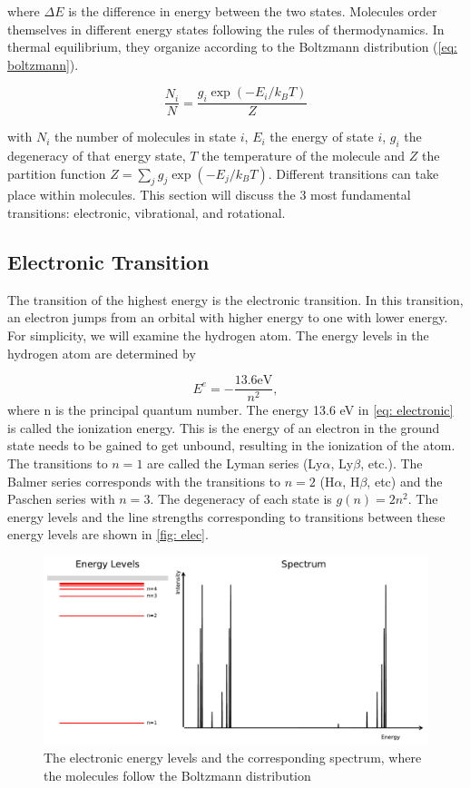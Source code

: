 \documentclass[twoside, single, authoryear, semicolon, 12pt]{lion-msc}
\newcommand{\4}{$_4$}
\newcommand{\3}{$_3$}
\newcommand{\2}{$_2$}
\begin{document}
where $\Delta E$ is the difference in energy between the two states. Molecules order themselves in different energy states following the rules of thermodynamics. In thermal equilibrium, they organize according to the Boltzmann distribution (\autoref{eq: boltzmann}). 

\begin{equation}
    \frac{N_i}{N}=\frac{g_i\exp{(-E_i/k_BT)}}{Z}
    \label{eq: boltzmann}
\end{equation}

with $N_i$ the number of molecules in state $i$, $E_i$ the energy of state $i$, $g_i$ the degeneracy of that energy state, $T$ the temperature of the molecule and $Z$ the partition function $Z=\sum_j g_j\exp{(-E_j/k_BT)}$.
Different transitions can take place within molecules. This section will discuss the 3 most fundamental transitions: electronic, vibrational, and rotational.

\subsection{Electronic Transition}
The transition of the highest energy is the electronic transition. In this transition, an electron jumps from an orbital with higher energy to one with lower energy. For simplicity, we will examine the hydrogen atom. The energy levels in the hydrogen atom are determined by 

\begin{equation}
    E^e=-\frac{13.6\mathrm{ eV}}{n^2},
    \label{eq: electronic}
\end{equation}
where n is the principal quantum number. The energy 13.6 eV in \autoref{eq: electronic} is called the ionization energy. This is the energy of an electron in the ground state needs to be gained to get unbound, resulting in the ionization of the atom. The transitions to $n=1$ are called the Lyman series (Ly$\alpha$, Ly$\beta$, etc.). The Balmer series corresponds with the transitions to $n=2$ (H$\alpha$, H$\beta$, etc) and the Paschen series with $n=3$. The degeneracy of each state is $g(n)=2n^2$. The energy levels and the line strengths corresponding to transitions between these energy levels are shown in \autoref{fig: elec}.

\begin{figure}[!ht]
    \centering
    \includegraphics[width=\linewidth]{Figures/ElecSpectrum.pdf}
    \caption{The electronic energy levels and the corresponding spectrum, where the molecules follow the Boltzmann distribution}
    \label{fig: elec}
\end{figure}
\end{document}
